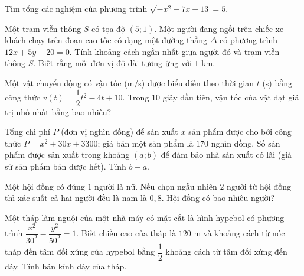 \caukq

\begin{ex}%
	Tìm tổng các nghiệm của phương trình $\sqrt{-x^2+7 x+13}=5$.
	\loigiai{
		
	}
\end{ex}

\begin{ex}%
	Một trạm viễn thông $S$ có tọa độ $(5;1)$. Một người đang ngồi trên chiếc xe khách chạy trên đoạn cao tốc có dạng một đường thẳng $\Delta$ có phương trình $12x+5y-20=0$. Tính khoảng cách ngắn nhất giữa người đó và trạm viễn thông $S$. Biết rằng mỗi đơn vị độ dài tương ứng với $1$ km.
	
	\loigiai{
	
	}
\end{ex}

\begin{ex}%
Một vật chuyển động có vận tốc (m/s) được biểu diễn theo thời gian $t$ (s) bằng công thức $v(t)=\dfrac{1}{2}t^2-4t+10$. Trong $10$ giây đầu tiên, vận tốc của vật đạt giá trị nhỏ nhất bằng bao nhiêu?

\loigiai{

}	
\end{ex}

\begin{ex}%
	Tổng chi phí $P$ (đơn vị nghìn đồng) để sản xuất $x$ sản phẩm được cho bởi công thức $P=x^2+30x+3300$; giá bán một sản phẩm là $170$ nghìn đồng. Số sản phẩm được sản xuất trong khoảng $(a;b)$ để đảm bảo nhà sản xuất có lãi (giả sử sản phẩm bán được hết). Tính $b-a$.
	
	\loigiai{
	
	}	
\end{ex}

\begin{ex}%
	Một hội đồng có đúng $1$ người là nữ. Nếu chọn ngẫu nhiên $2$ người từ hội đồng thì xác suất cả hai người đều là nam là $0{,}8$. Hội đồng có bao nhiêu người?
	\loigiai{
		
	}	
\end{ex}

\begin{ex}%
	Một tháp làm nguội của một nhà máy có mặt cắt là hình hypebol có phương trình $\dfrac{x^2}{30^2}-\dfrac{y^2}{50^2}=1$. Biết chiều cao của tháp là $120$ m và khoảng cách từ nóc tháp đến tâm đối xứng của hypebol bằng $\dfrac{1}{2}$ khoảng cách từ tâm đối xứng đến đáy. Tính bán kính đáy của tháp.
	
	\loigiai{
	
	}	
\end{ex}

